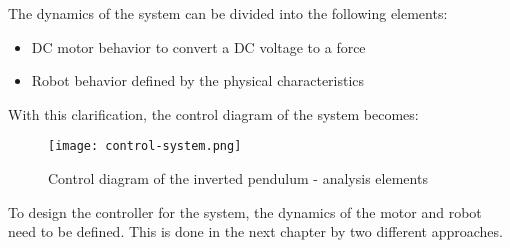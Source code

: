 The dynamics of the system can be divided into the following elements:

\begin{itemize}
	\item DC motor behavior to convert a DC voltage to a force
	\item Robot behavior defined by the physical characteristics
\end{itemize}

With this clarification, the control diagram of the system becomes:

\begin{figure}[h]
	\centering
	\texttt{[image: control-system.png]}
	\caption{Control diagram of the inverted pendulum - analysis elements}\label{fig:condiag2}
\end{figure}

To design the controller for the system, the dynamics of the motor and robot need to be defined. This is done in the next chapter by two different approaches.
